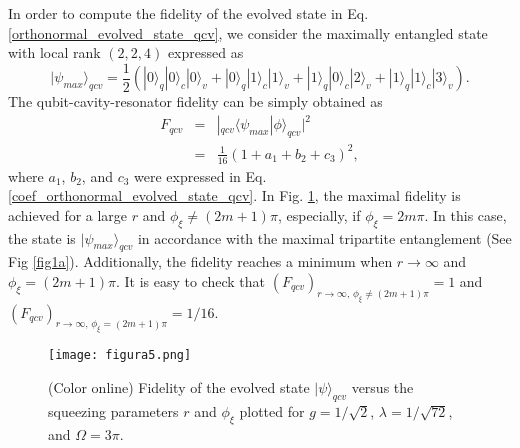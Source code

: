 In order to compute the fidelity of the evolved state in Eq. \eqref{orthonormal_evolved_state_qcv}, we consider the maximally entangled state with local rank $(2, 2, 4)$ \cite{miyake2004multipartite} expressed as
\begin{equation}
|\psi_{max}\rangle_{qcv}=\frac{1}{2}\left(|0\rangle_{q}|0\rangle_{c}|0\rangle_{v}+|0\rangle_{q}|1\rangle_{c}|1\rangle_{v}+|1\rangle_{q}|0\rangle_{c}|2\rangle_{v}+|1\rangle_{q}|1\rangle_{c}|3\rangle_{v}\right).
\end{equation}
The qubit-cavity-resonator fidelity can be simply obtained as
\begin{eqnarray}
F_{qcv}&=&|_{qcv}\langle \psi_{max}|\phi\rangle_{qcv}|^{2}\nonumber\\
       &=&\frac{1}{16}\left(1+a_{1}+b_{2}+c_{3}\right)^{2},
\end{eqnarray}
where $a_{1}$, $b_{2}$, and $c_{3}$ were expressed in Eq. \eqref{coef_orthonormal_evolved_state_qcv}. In Fig. \ref{fig2}, the maximal fidelity is achieved for a large $r$ and $\phi_{\xi}\neq (2m+1)\pi$, especially, if $\phi_{\xi}=2m\pi$. In this case, the state is $|\psi_{max}\rangle_{qcv}$ in accordance with the maximal tripartite entanglement (See Fig \ref{fig1a}). Additionally, the fidelity reaches a minimum when $r\rightarrow \infty$ and $\phi_{\xi}=(2m+1)\pi$. It is easy to check that $(F_{qcv})_{r\rightarrow \infty, \,\phi_{\xi}\neq (2m+1)\pi}=1$ and $(F_{qcv})_{r\rightarrow \infty, \,\phi_{\xi}=(2m+1)\pi}=1/16$.

\begin{figure}
	\centering
	\texttt{[image: figura5.png]}
	\caption{(Color online) Fidelity of the evolved state $|\psi\rangle_{qcv}$ versus the squeezing parameters $r$ and $\phi_{\xi}$ plotted for $g=1/\sqrt{2}$, $\lambda=1/\sqrt{72}$, and $\Omega=3\pi$.}
	\label{fig2}
\end{figure}

